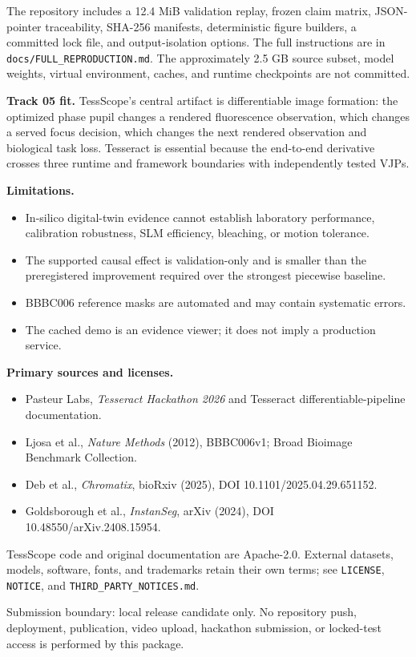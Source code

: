 \documentclass[10pt]{article}
\newcommand{\scopebox}[1]{%
  \noindent\colorbox{soft}{\parbox{0.965\linewidth}{\small #1}}}
\begin{document}
The repository includes a 12.4 MiB validation replay, frozen claim matrix, JSON-pointer
traceability, SHA-256 manifests, deterministic figure builders, a committed lock file,
and output-isolation options. The full instructions are in
\texttt{docs/FULL\_REPRODUCTION.md}. The approximately 2.5 GB source subset, model
weights, virtual environment, caches, and runtime checkpoints are not committed.

\textbf{Track 05 fit.} TessScope's central artifact is differentiable image formation:
the optimized phase pupil changes a rendered fluorescence observation, which changes a
served focus decision, which changes the next rendered observation and biological task
loss. Tesseract is essential because the end-to-end derivative crosses three runtime and
framework boundaries with independently tested VJPs.

\textbf{Limitations.}
\begin{itemize}
  \item In-silico digital-twin evidence cannot establish laboratory performance,
        calibration robustness, SLM efficiency, bleaching, or motion tolerance.
  \item The supported causal effect is validation-only and is smaller than the
        preregistered improvement required over the strongest piecewise baseline.
  \item BBBC006 reference masks are automated and may contain systematic errors.
  \item The cached demo is an evidence viewer; it does not imply a production service.
\end{itemize}

\textbf{Primary sources and licenses.}
\begin{itemize}
  \item Pasteur Labs, \emph{Tesseract Hackathon 2026} and Tesseract differentiable-pipeline documentation.
  \item Ljosa et al., \emph{Nature Methods} (2012), BBBC006v1; Broad Bioimage Benchmark Collection.
  \item Deb et al., \emph{Chromatix}, bioRxiv (2025), DOI 10.1101/2025.04.29.651152.
  \item Goldsborough et al., \emph{InstanSeg}, arXiv (2024), DOI 10.48550/arXiv.2408.15954.
\end{itemize}

TessScope code and original documentation are Apache-2.0. External datasets, models,
software, fonts, and trademarks retain their own terms; see \texttt{LICENSE},
\texttt{NOTICE}, and \texttt{THIRD\_PARTY\_NOTICES.md}.

\scopebox{Submission boundary: local release candidate only. No repository push,
deployment, publication, video upload, hackathon submission, or locked-test access is
performed by this package.}
\end{document}
